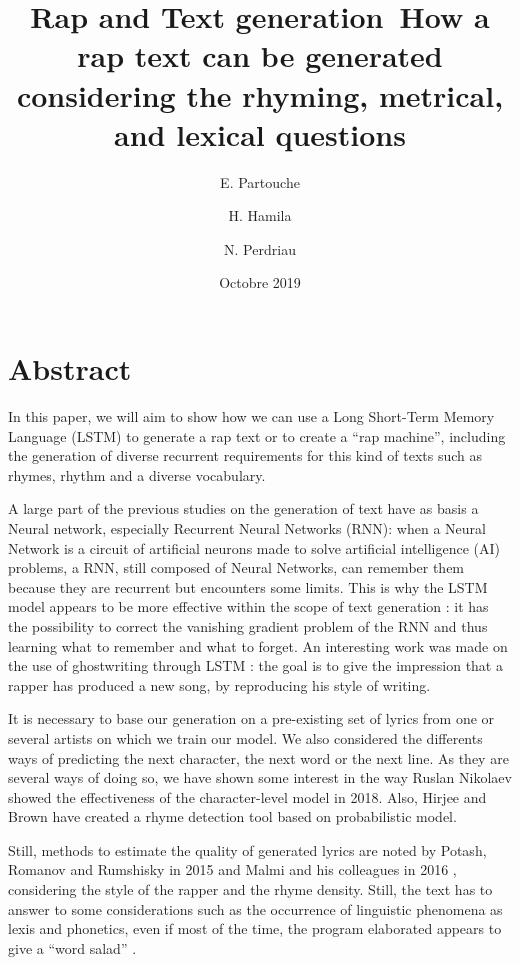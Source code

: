 \documentclass[12pt,a4paper]{article}
\title{Rap and Text generation\newline\ How a rap text can be generated considering the rhyming, metrical, and lexical questions}
\date{Octobre 2019}
\author{E. Partouche \and H. Hamila \and N. Perdriau}
\begin{document}
\maketitle
\tableofcontents
\newpage

\section{Abstract}

In this paper, we will aim to show how we can use a Long Short-Term Memory Language (LSTM) to generate a rap text or to create a “rap machine”, including the generation of diverse recurrent requirements for this kind of texts such as rhymes, rhythm and a diverse vocabulary. \newline

A large part of the previous studies on the generation of text \cite{sutskever_generating_nodate} have as basis a Neural network, especially Recurrent Neural Networks (RNN): when a Neural Network is a circuit of artificial neurons made to solve artificial intelligence (AI) problems, a RNN, still composed of Neural Networks, can remember them because they are recurrent but encounters some limits. This is why the LSTM model appears to be more effective within the scope of text generation \cite{chollet_deep_2018} \cite{raiman_nano_2015} \cite{surma_text_2018} : it has the possibility to correct the vanishing gradient problem of the RNN and thus learning what to remember and what to forget. An interesting work was made on the use of ghostwriting through LSTM  \cite{potash_ghostwriter:_2015} : the goal is to give the impression that a rapper has produced a new song, by reproducing his style of writing. \newline

It is necessary to base our generation on a pre-existing set of lyrics from one or several artists on which we train our model. We also considered the differents ways of predicting the next character, the next word or the next line. As they are several ways of doing so, we have shown some interest in the way Ruslan Nikolaev \cite{nikolaev_generating_2018} \cite{nikolaev_drake-lyric-generator_2018} showed the effectiveness of the character-level model in 2018. Also, Hirjee and Brown have created a rhyme detection tool based on probabilistic model.\cite{hirjee_using_2010} \newline

Still, methods to estimate the quality of generated lyrics are noted by Potash, Romanov and Rumshisky in 2015 and Malmi and his colleagues in 2016 \cite{malmi_dopelearning:_2016}, considering the style of the rapper and the rhyme density. Still, the text has to answer to some considerations such as the occurrence of linguistic phenomena as lexis and phonetics, even if most of the time, the program elaborated appears to give a “word salad”   \cite{oliveira_automatic_nodate} \cite{paupier_how_2018}. \newline
\end{document}
